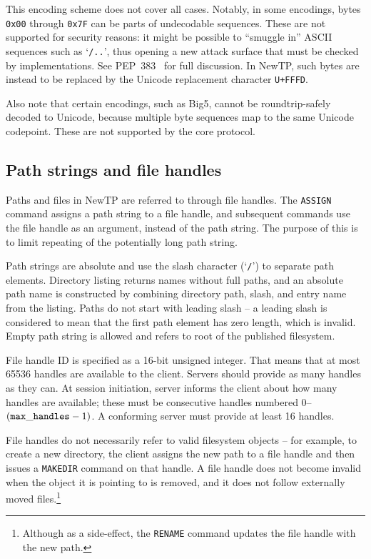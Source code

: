 This encoding scheme does not cover all cases. Notably, in some encodings, bytes {\tt 0x00} through {\tt 0x7F}
can be parts of undecodable sequences. These are not supported for security reasons: it might be possible to
``smuggle in'' ASCII sequences such as `{\tt /..}', thus opening a new attack surface that must be checked by
implementations. See PEP~383~\cite{pep383} for full discussion. In NewTP, such bytes are instead to be
replaced by the Unicode replacement character {\tt U+FFFD}.

Also note that certain encodings, such as Big5, cannot be roundtrip-safely decoded to Unicode, because
multiple byte sequences map to the same Unicode codepoint. These are not supported by the core protocol.

%

\subsection{Path strings and file handles}

Paths and files in NewTP are referred to through file handles. The {\tt ASSIGN} command assigns a path string
to a file handle, and subsequent commands use the file handle as an argument, instead of the path string. The
purpose of this is to limit repeating of the potentially long path string.

Path strings are absolute and use the slash character (`{\tt /}') to separate path elements. Directory listing
returns names without full paths, and an absolute path name is constructed by combining directory path, slash, and
entry name from the listing. Paths do not start with leading slash -- a leading slash is considered to mean
that the first path element has zero length, which is invalid. Empty path string is allowed and refers to root
of the published filesystem.

File handle ID is specified as a 16-bit unsigned integer. That means that at most 65536 handles are available
to the client. Servers should provide as many handles as they can. At session initiation, server informs the
client about how many handles are available; these must be consecutive handles numbered 0--$({\tt max\_handles}
- 1)$. A conforming server must provide at least 16 handles.

File handles do not necessarily refer to valid filesystem objects -- for example, to create a new directory,
the client assigns the new path to a file handle and then issues a {\tt MAKEDIR} command on that handle.
A file handle does not become invalid when the object it is pointing to is removed, and it does not follow
externally moved files.\footnote{Although as a side-effect, the {\tt RENAME} command updates the file handle
with the new path.}

